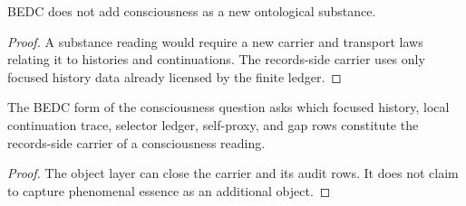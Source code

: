 \begin{corollary}
\label{cor:philosophy-consciousness-not-reified}
BEDC does not add consciousness as a new ontological substance.
\end{corollary}
\begin{proof}
A substance reading would require a new carrier and transport laws
relating it to histories and continuations. The records-side carrier
uses only focused history data already licensed by the finite ledger.
\end{proof}

\begin{corollary}
\label{cor:philosophy-consciousness-closure-question}
The BEDC form of the consciousness question asks which focused history,
local continuation trace, selector ledger, self-proxy, and gap rows
constitute the records-side carrier of a consciousness reading.
\end{corollary}
\begin{proof}
The object layer can close the carrier and its audit rows. It does not
claim to capture phenomenal essence as an additional object.
\end{proof}

